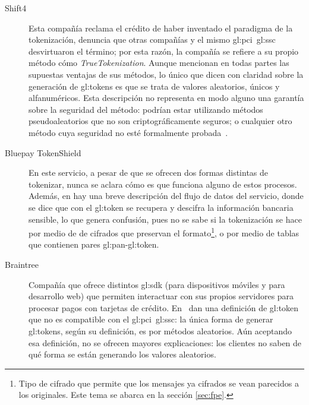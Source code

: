 \begin{description}

  \item[Shift4]
    Esta compañía reclama el crédito de haber inventado el paradigma de
    la tokenización, denuncia que otras compañías y el mismo
    \gls{gl:pci}~\gls{gl:ssc} desvirtuaron el término; por esta razón, la
    compañía se refiere a su propio método cómo \textit{TrueTokenization}.
    Aunque mencionan en todas partes las supuestas ventajas de sus métodos,
    lo único que dicen con claridad sobre la generación de \glspl{gl:token} es
    que se trata de valores aleatorios, únicos y alfanuméricos. Esta descripción
    no representa en modo alguno una garantía sobre la seguridad del
    método: podrían estar utilizando métodos pseudoaleatorios que no son
    criptográficamente seguros; o cualquier otro método cuya seguridad no esté
    formalmente probada~\cite{shif4_uno, shif4_dos}.

  \item[Bluepay TokenShield]
    En este servicio, a pesar de que se ofrecen dos formas distintas de
    tokenizar, nunca se aclara cómo es que funciona alguno de estos procesos.
    Además, en \cite{bluepay_tokenshield} hay una breve descripción del flujo
    de datos del servicio, donde se dice que con el \gls{gl:token} se recupera
    y descifra la información bancaria sensible, lo que genera confusión, pues
    no se sabe si la tokenización se hace por medio de de cifrados que
    preservan el formato\footnote{Tipo de cifrado que permite que los mensajes
    ya cifrados se vean parecidos a los originales. Este tema se abarca en la
    sección \ref{sec:fpe}.}, o por medio de tablas que
    contienen pares \gls{gl:pan}-\gls{gl:token}.

  \item[Braintree]
    Compañía que ofrece distintos \gls{gl:sdk} (para dispositivos móviles y
    para desarrollo web) que permiten interactuar con sus propios servidores
    para procesar pagos con tarjetas de crédito. En~\cite{braintree_uno}
    dan una definición de \gls{gl:token} que no es compatible con el
    \gls{gl:pci}~\gls{gl:ssc}: la única forma de generar \glspl{gl:token},
    según su definición, es por métodos aleatorios. Aún aceptando
    esa definición, no se ofrecen mayores explicaciones: los clientes no
    saben de qué forma se están generando los valores aleatorios.


\end{description}
